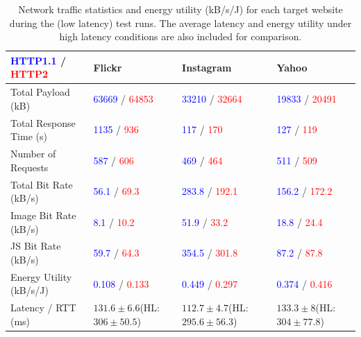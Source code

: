 \documentclass{article}
\begin{document}
\begin{table}[h!]
    \caption{Network traffic statistics and energy utility (kB/s/J) for each target website during the (low latency) test runs. The average latency and energy utility under high latency conditions are also included for comparison.}
    \label{table:network-stats}
    \begin{tabular}{|l|K{2.7cm}|K{2.8cm}|K{2.5cm}|}
        \hline
        \textcolor{blue}{HTTP1.1} / \textcolor{red}{HTTP2} & \textbf{Flickr} & \textbf{Instagram} & \textbf{Yahoo} \\ \hline
        Total Payload (kB) & \textcolor{blue}{63669} / \textcolor{red}{64853}  & \textcolor{blue}{33210} / \textcolor{red}{32664}  &
        \textcolor{blue}{19833} / \textcolor{red}{20491}  \\ \hline
        Total Response Time (s) & \textcolor{blue}{1135} / \textcolor{red}{936}  &\textcolor{blue}{117} / \textcolor{red}{170}  &
        \textcolor{blue}{127} / \textcolor{red}{119}  \\ \hline

        Number of Requests & \textcolor{blue}{587} / \textcolor{red}{606} & \textcolor{blue}{469} / \textcolor{red}{464} & \textcolor{blue}{511} / \textcolor{red}{509} \\ \hline

        Total Bit Rate (kB/s) & \textcolor{blue}{56.1} / \textcolor{red}{69.3} & \textcolor{blue}{283.8} / \textcolor{red}{192.1} & \textcolor{blue}{156.2} / \textcolor{red}{172.2} \\  \hline

        Image Bit Rate (kB/s) & \textcolor{blue}{8.1} / \textcolor{red}{10.2} &\textcolor{blue}{51.9} / \textcolor{red}{33.2}  & \textcolor{blue}{18.8} / \textcolor{red}{24.4}  \\ \hline

        JS Bit Rate (kB/s) & \textcolor{blue}{59.7} / \textcolor{red}{64.3} &\textcolor{blue}{354.5} / \textcolor{red}{301.8}  & \textcolor{blue}{87.2} / \textcolor{red}{87.8}  \\ \hline

        Energy Utility (kB/s/J) & \textcolor{blue}{0.108} / \textcolor{red}{0.133} & \textcolor{blue}{0.449} / \textcolor{red}{0.297} & \textcolor{blue}{0.374} / \textcolor{red}{0.416} \\ \hline

        Latency / RTT (ms) & $131.6\pm6.6$\newline(HL: $306\pm50.5$)    & $112.7\pm4.7$\newline(HL: $295.6\pm56.3$) & $133.3\pm8$\newline(HL: $304\pm77.8$) \\ \hline
    \end{tabular}
\end{table}
\end{document}
